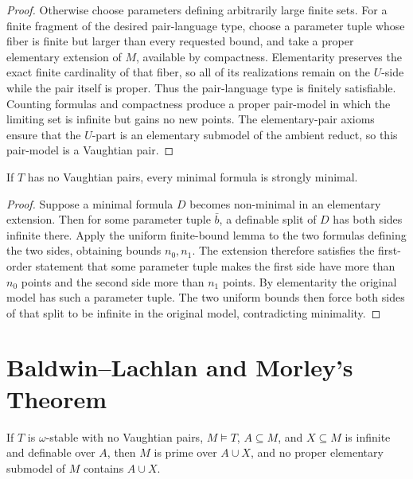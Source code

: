 \begin{proof}
Otherwise choose parameters defining arbitrarily large finite sets.  For
a finite fragment of the desired pair-language type, choose a parameter
tuple whose fiber is finite but larger than every requested bound, and
take a proper elementary extension of \(M\), available by compactness.
Elementarity preserves the exact finite cardinality of that fiber, so all
of its realizations remain on the \(U\)-side while the pair itself is
proper.  Thus the pair-language type is finitely satisfiable.  Counting
formulas and compactness produce a proper pair-model in which the
limiting set is infinite but gains no new points.  The elementary-pair
axioms ensure that the \(U\)-part is an elementary submodel of the
ambient reduct, so this pair-model is a Vaughtian pair.
\end{proof}

\begin{theorem}
\label{thm:minimal-formula-strongly-minimal}
If \(T\) has no Vaughtian pairs, every minimal formula is strongly
minimal.
\end{theorem}

\begin{proof}
Suppose a minimal formula \(D\) becomes non-minimal in an elementary
extension.  Then for some parameter tuple \(\bar b\), a definable split
of \(D\) has both sides infinite there.  Apply the uniform finite-bound
lemma to the two formulas defining the two sides, obtaining bounds
\(n_0,n_1\).  The extension therefore satisfies the first-order
statement that some parameter tuple makes the first side have more than
\(n_0\) points and the second side more than \(n_1\) points.  By
elementarity the original model has such a parameter tuple.  The two
uniform bounds then force both sides of that split to be infinite in the
original model, contradicting minimality.
\end{proof}

\section{Baldwin--Lachlan and Morley's Theorem}

\begin{lemma}
\label{lem:prime-over-infinite-definable-set}
If \(T\) is \(\omega\)-stable with no Vaughtian pairs, \(M\models T\),
\(A\subseteq M\), and \(X\subseteq M\) is infinite and definable over
\(A\), then \(M\) is prime over \(A\cup X\), and no proper elementary
submodel of \(M\) contains \(A\cup X\).
\end{lemma}

